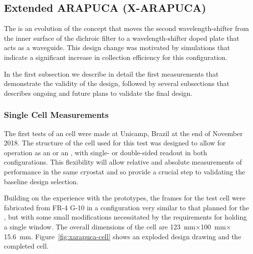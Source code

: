 
\subsection{Extended ARAPUCA (X-ARAPUCA)}
\label{sec:xarapuca-valid}

The  is an evolution of the  concept that moves the second wavelength-shifter from the  inner surface of the dichroic filter to a wavelength-shifter doped plate that acts as a waveguide. This design change was motivated by  simulations that indicate a significant increase in collection efficiency for this configuration. 

In the first subsection we describe in detail the first measurements that demonstrate the validity of the design, followed by several subsections that describes ongoing and future plans to validate the final design.

\subsubsection{Single Cell  Measurements}
\label{sec:xarapuca-unicamp}

The first tests of an  cell were made at Unicamp, Brazil at the end of November 2018. 
The structure of the cell used for this test was designed to allow for operation as an  or an , with single- or double-sided readout in both configurations.  This flexibility will allow relative and absolute measurements of performance in the same cryostat and so provide a crucial step to validating the baseline design selection.

Building on the experience with the  prototypes, the frames for the test cell were fabricated from FR-4 G-10 in a configuration very similar to that planned for the , but with some small modifications necessitated by the requirements for holding a single window. The overall dimensions of the cell are \SI{123}{mm}$\times$\SI{100}{mm}$\times$\SI{15.6}{mm}. Figure~\ref{fig:xarapuca-cell} shows an exploded design drawing and the completed cell. 


